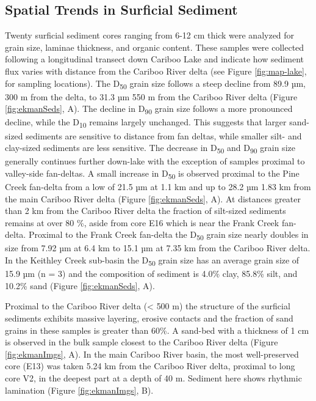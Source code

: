 \documentclass[Royal,times,doublespace,sageh]{sagej}
\begin{document}
\hypertarget{spatial-trends-in-surficial-sediment}{%
\subsection{Spatial Trends in Surficial
Sediment}\label{spatial-trends-in-surficial-sediment}}

Twenty surficial sediment cores ranging from 6-12 cm thick were analyzed
for grain size, laminae thickness, and organic content. These samples
were collected following a longitudinal transect down Cariboo Lake and
indicate how sediment flux varies with distance from the Cariboo River
delta (see Figure \ref{fig:map-lake}, for sampling locations). The
D\textsubscript{50} grain size follows a steep decline from 89.9 µm, 300
m from the delta, to 31.3 µm 550 m from the Cariboo River delta (Figure
\ref{fig:ekmanSeds}, A). The decline in D\textsubscript{90} grain size
follows a more pronounced decline, while the D\textsubscript{10} remains
largely unchanged. This suggests that larger sand-sized sediments are
sensitive to distance from fan deltas, while smaller silt- and
clay-sized sediments are less sensitive. The decrease in
D\textsubscript{50} and D\textsubscript{90} grain size generally
continues further down-lake with the exception of samples proximal to
valley-side fan-deltas. A small increase in D\textsubscript{50} is
observed proximal to the Pine Creek fan-delta from a low of 21.5 µm at
1.1 km and up to 28.2 µm 1.83 km from the main Cariboo River delta
(Figure \ref{fig:ekmanSeds}, A). At distances greater than 2 km from the
Cariboo River delta the fraction of silt-sized sediments remains at over
80 \%, aside from core E16 which is near the Frank Creek fan-delta.
Proximal to the Frank Creek fan-delta the D\textsubscript{50} grain size
nearly doubles in size from 7.92 µm at 6.4 km to 15.1 µm at 7.35 km from
the Cariboo River delta. In the Keithley Creek sub-basin the
D\textsubscript{50} grain size has an average grain size of 15.9 µm (n =
3) and the composition of sediment is 4.0\% clay, 85.8\% silt, and
10.2\% sand (Figure \ref{fig:ekmanSeds}, A).

Proximal to the Cariboo River delta (\textless{} 500 m) the structure of
the surficial sediments exhibits massive layering, erosive contacts and
the fraction of sand grains in these samples is greater than 60\%. A
sand-bed with a thickness of 1 cm is observed in the bulk sample closest
to the Cariboo River delta (Figure \ref{fig:ekmanImgs}, A). In the main
Cariboo River basin, the most well-preserved core (E13) was taken 5.24
km from the Cariboo River delta, proximal to long core V2, in the
deepest part at a depth of 40 m. Sediment here shows rhythmic lamination
(Figure \ref{fig:ekmanImgs}, B).
\end{document}

